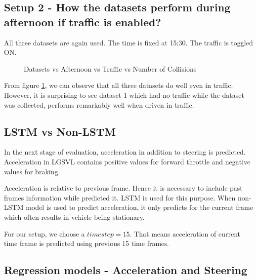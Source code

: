 \subsection{Setup 2 - How the datasets perform during afternoon if traffic is enabled?}
All three datasets are again used. The time is fixed at 15:30. The traffic is toggled ON.

\begin{figure}
	\centering
    \def\svgwidth{0.6\textwidth}
    \caption{Datasets vs Afternoon vs Traffic vs Number of Collisions}
    \label{fig:dsvslcvstrafficncolsetup2}
\end{figure}
From figure \ref{fig:dsvslcvstrafficncolsetup2}, we can observe that all three datasets do
well even in traffic. However, it is surprising to see dataset 1 which had no traffic
while the dataset was collected, performs remarkably well when driven in traffic.
\subsection{LSTM vs Non-LSTM}
In the next stage of evaluation, acceleration in addition to steering is predicted.
Acceleration in LGSVL contains positive values for forward throttle and negative values
for braking.

Acceleration is relative to previous frame. Hence it is necessary to include past frames
information while predicted it. LSTM is used for this purpose. When non-LSTM model is used
to predict acceleration, it only predicts for the current frame which often results in
vehicle being stationary.

For our setup, we choose a $timestep = 15$. That means acceleration of current time frame
is predicted using previous 15 time frames.

\subsection{Regression models - Acceleration and Steering}
